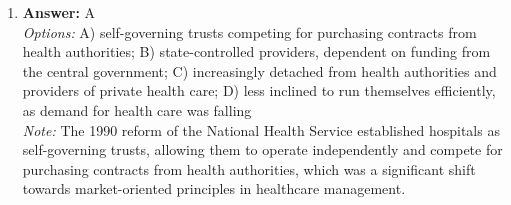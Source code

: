 \documentclass[12pt]{article}
\begin{document}
\begin{enumerate}[label=\arabic*.]
\\ \textit{Note:} The correct answer highlights that 'collective representations' in Durkheim's work encapsulate the shared beliefs and moral values of a society, which are often embodied and communicated through symbols or figures that unify and guide collective social behavior.
\item \textbf{Answer:} A
\\ \textit{Options:} A) self-governing trusts competing for purchasing contracts from health authorities; B) state-controlled providers, dependent on funding from the central government; C) increasingly detached from health authorities and providers of private health care; D) less inclined to run themselves efficiently, as demand for health care was falling
\\ \textit{Note:} The 1990 reform of the National Health Service established hospitals as self-governing trusts, allowing them to operate independently and compete for purchasing contracts from health authorities, which was a significant shift towards market-oriented principles in healthcare management.
\end{enumerate}
\end{document}
